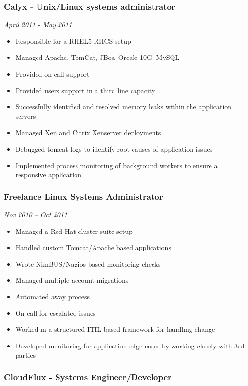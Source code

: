 \subsubsection{Calyx - Unix/Linux systems administrator}

\emph{April 2011 - May 2011}

\begin{itemize}
\item
  Responsible for a RHEL5 RHCS setup
\item
  Managed Apache, TomCat, JBos, Orcale 10G, MySQL
\item
  Provided on-call support
\item
  Provided users support in a third line capacity
\item
  Successfully identified and resolved memory leaks within the
  application servers
\item
  Managed Xen and Citrix Xenserver deployments
\item
  Debugged tomcat logs to identify root causes of application issues
\item
  Implemented process monitoring of background workers to ensure a
  responsive application
\end{itemize}
\subsubsection{Freelance Linux Systems Administrator}

\emph{Nov 2010 -- Oct 2011}

\begin{itemize}
\item
  Managed a Red Hat cluster suite setup
\item
  Handled custom Tomcat/Apache based applications
\item
  Wrote NimBUS/Nagios based monitoring checks
\item
  Managed multiple account migrations
\item
  Automated away process
\item
  On-call for escalated issues
\item
  Worked in a structured ITIL based framework for handling change
\item
  Developed monitoring for application edge cases by working closely
  with 3rd parties
\end{itemize}
\subsubsection{CloudFlux - Systems Engineer/Developer}

